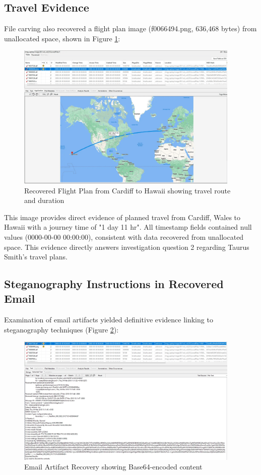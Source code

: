 \subsection{Travel Evidence}
File carving also recovered a flight plan image (f0066494.png, 636,468 bytes) from unallocated space, shown in Figure \ref{fig:flight_plan}:

\begin{figure}[htbp]
    \centering
    \includegraphics[width=0.95\textwidth]{images/Evidence Examination/Image5.png}
    \caption{Recovered Flight Plan from Cardiff to Hawaii showing travel route and duration}
    \label{fig:flight_plan}
\end{figure}

This image provides direct evidence of planned travel from Cardiff, Wales to Hawaii with a journey time of "1 day 11 hr". All timestamp fields contained null values (0000-00-00 00:00:00), consistent with data recovered from unallocated space. This evidence directly answers investigation question 2 regarding Taurus Smith's travel plans.

\subsection{Steganography Instructions in Recovered Email}
Examination of email artifacts yielded definitive evidence linking to steganography techniques (Figure \ref{fig:email_artifact}):

\begin{figure}[htbp]
    \centering
    \includegraphics[width=0.95\textwidth]{images/Evidence Examination/Image6.png}
    \caption{Email Artifact Recovery showing Base64-encoded content}
    \label{fig:email_artifact}
\end{figure}


